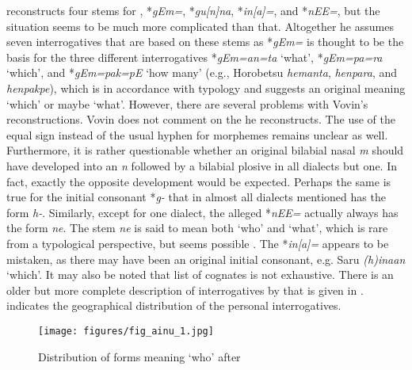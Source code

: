 \citet{Vovin1993} reconstructs four  stems for , *\textit{gEm=}, *\textit{gu[n]na}, *\textit{in[a]=}, and *\textit{nEE=}, but the situation seems to be much more complicated than that. Altogether he assumes seven interrogatives that are based on these stems as *\textit{gEm=} is thought to be the basis for the three different interrogatives *\textit{gEm=an=ta} ‘what’, *\textit{gEm=pa=ra} ‘which’, and *\textit{gEm=pak=pE} ‘how many’ (e.g., Horobetsu \textit{hemanta}, \textit{henpara}, and \textit{henpakpe}), which is in accordance with  typology and suggests an original meaning ‘which’ or maybe ‘what’. However, there are several problems with Vovin’s reconstructions. Vovin does not comment on the  he reconstructs. The use of the equal sign instead of the usual hyphen for morphemes remains unclear as well. Furthermore, it is rather questionable whether an original bilabial nasal \textit{m} should have developed into an \textit{n} followed by a bilabial plosive in all dialects but one. In fact, exactly the opposite development would be expected. Perhaps the same is true for the initial consonant *\textit{g-} that in almost all dialects mentioned has the form \textit{h-}. Similarly, except for one dialect, the alleged  *\textit{nEE=} actually always has the form \textit{ne}. The stem \textit{ne} is said to mean both ‘who’ and ‘what’, which is rare from a typological perspective, but seems possible \citep{Cysouw2005,Cysouw2007}. The  *\textit{in[a]=} appears to be mistaken, as there may have been an original initial consonant, e.g. Saru \textit{(h)inaan} ‘which’. It may also be noted that  list of cognates is not exhaustive. There is an older but more complete description of interrogatives by \cite[64f.]{Asai1974} that is given in .  indicates the geographical distribution of the personal interrogatives.

\begin{figure}[t]
\texttt{[image: figures/fig\_ainu\_1.jpg]}
\caption{Distribution of forms meaning ‘who’ after \cite[64f.]{Asai1974}}
\label{fig:ainu:1}
\end{figure}


